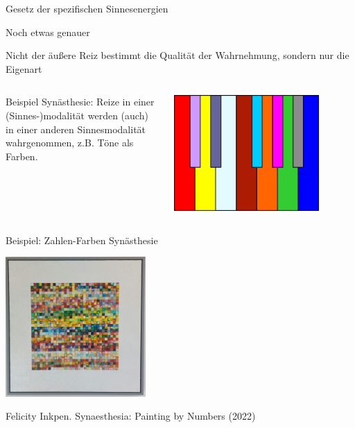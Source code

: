 \documentclass[aspectratio=169]{beamer}
\begin{document}
\begin{frame}{Gesetz der spezifischen Sinnesenergien}


\begin{block}{Noch etwas genauer}

Nicht der äußere Reiz bestimmt die Qualität der Wahrnehmung, sondern nur die Eigenart 

\end{block}

\begin{columns}[c]



\begin{column}{7cm}

Beispiel Synästhesie: Reize in einer (Sinnes-)modalität werden (auch) in einer anderen Sinnesmodalität wahrgenommen, z.B. Töne als Farben.

\end{column}

\begin{column}{7cm}
\begin{center}
    \includegraphics[width=0.8\textwidth]{Scriabin_keyboard.png}
\end{center}

\end{column}

\end{columns}
\end{frame}


\begin{frame}{Beispiel: Zahlen-Farben Synästhesie}
\begin{center}
    \includegraphics[width=0.4\textwidth]{fliss_inkpen_synesthesia.jpg}
\end{center}


Felicity Inkpen. Synaesthesia: Painting by Numbers (2022) 

\end{frame}
\end{document}
